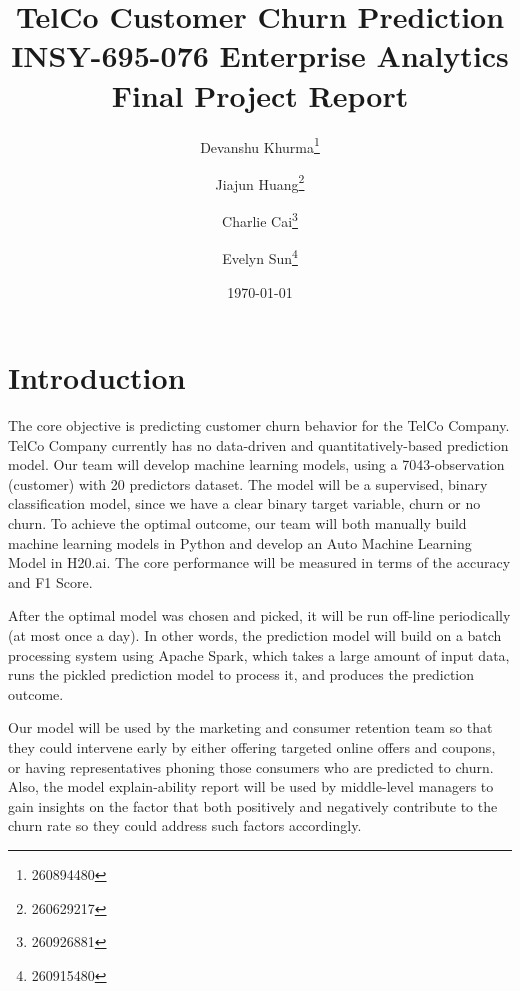 \documentclass[12pt]{article}
\begin{document}
\begin{titlepage}
\title{TelCo Customer Churn Prediction\\
  \large INSY-695-076 Enterprise Analytics Final Project Report}
\author{Devanshu Khurma\thanks{260894480}\\
\and Jiajun Huang\thanks{260629217}\\
\and Charlie Cai\thanks{260926881}\\
\and Evelyn Sun\thanks{260915480}}
\date{\today}
\maketitle
\setcounter{page}{0}
\thispagestyle{empty}
\end{titlepage}
\pagebreak \newpage
\tableofcontents



\doublespacing

\newpage
\section{Introduction} \label{sec:introduction}

The core objective is predicting customer churn behavior for the TelCo Company. TelCo Company currently has no data-driven and quantitatively-based prediction model. Our team will develop machine learning models, using a 7043-observation (customer) with 20 predictors dataset. The model will be a supervised, binary classification model, since we have a clear binary target variable, churn or no churn. To achieve the optimal outcome, our team will both manually build machine learning models in Python and develop an Auto Machine Learning Model in H20.ai. The core performance will be measured in terms of the accuracy and F1 Score.

After the optimal model was chosen and picked, it will be run off-line periodically (at most once a day). In other words, the prediction model will build on a batch processing system using Apache Spark, which takes a large amount of input data, runs the pickled prediction model to process it, and produces the prediction outcome. 

Our model will be used by the marketing and consumer retention team so that they could intervene early by either offering targeted online offers and coupons, or having representatives phoning those consumers who are predicted to churn. Also, the model explain-ability report will be used by middle-level managers to gain insights on the factor that both positively and negatively contribute to the churn rate so they could address such factors accordingly. 
\end{document}
